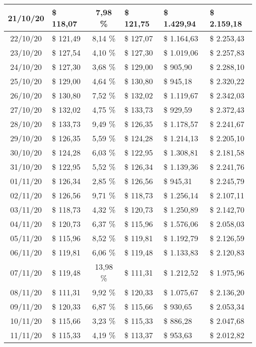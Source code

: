 \begin{center}
\begin{small}
\begin{longtable}{|c|l|c|l|l|l|}
21/10/20 & \$ 118,07 & 7,98 \% & \$ 121,75 & \$ 1.429,94 & \$ 2.159,18 \\ \hline
22/10/20 & \$ 121,49 & 8,14 \% & \$ 127,07 & \$ 1.164,63 & \$ 2.253,43 \\ \hline
23/10/20 & \$ 127,54 & 4,10 \% & \$ 127,30 & \$ 1.019,06 & \$ 2.257,83 \\ \hline
24/10/20 & \$ 127,30 & 3,68 \% & \$ 129,00 & \$ 905,90 & \$ 2.288,10 \\ \hline
25/10/20 & \$ 129,00 & 4,64 \% & \$ 130,80 & \$ 945,18 & \$ 2.320,22 \\ \hline
26/10/20 & \$ 130,80 & 7,52 \% & \$ 132,02 & \$ 1.119,67 & \$ 2.342,03 \\ \hline
27/10/20 & \$ 132,02 & 4,75 \% & \$ 133,73 & \$ 929,59 & \$ 2.372,43 \\ \hline
28/10/20 & \$ 133,73 & 9,49 \% & \$ 126,35 & \$ 1.178,57 & \$ 2.241,67 \\ \hline
29/10/20 & \$ 126,35 & 5,59 \% & \$ 124,28 & \$ 1.214,13 & \$ 2.205,10 \\ \hline
30/10/20 & \$ 124,28 & 6,03 \% & \$ 122,95 & \$ 1.308,81 & \$ 2.181,58 \\ \hline
31/10/20 & \$ 122,95 & 5,52 \% & \$ 126,34 & \$ 1.139,36 & \$ 2.241,76 \\ \hline
01/11/20 & \$ 126,34 & 2,85 \% & \$ 126,56 & \$ 945,31 & \$ 2.245,79 \\ \hline
02/11/20 & \$ 126,56 & 9,71 \% & \$ 118,73 & \$ 1.256,14 & \$ 2.107,11 \\ \hline
03/11/20 & \$ 118,73 & 4,32 \% & \$ 120,73 & \$ 1.250,89 & \$ 2.142,70 \\ \hline
04/11/20 & \$ 120,73 & 6,37 \% & \$ 115,96 & \$ 1.576,06 & \$ 2.058,03 \\ \hline
05/11/20 & \$ 115,96 & 8,52 \% & \$ 119,81 & \$ 1.192,79 & \$ 2.126,59 \\ \hline
06/11/20 & \$ 119,81 & 6,06 \% & \$ 119,48 & \$ 1.133,83 & \$ 2.120,83 \\ \hline
07/11/20 & \$ 119,48 & 13,98 \% & \$ 111,31 & \$ 1.212,52 & \$ 1.975,96 \\ \hline
08/11/20 & \$ 111,31 & 9,92 \% & \$ 120,33 & \$ 1.075,67 & \$ 2.136,20 \\ \hline
09/11/20 & \$ 120,33 & 6,87 \% & \$ 115,66 & \$ 930,65 & \$ 2.053,34 \\ \hline
10/11/20 & \$ 115,66 & 3,23 \% & \$ 115,33 & \$ 886,28 & \$ 2.047,68 \\ \hline
11/11/20 & \$ 115,33 & 4,19 \% & \$ 113,37 & \$ 953,63 & \$ 2.012,82 \\ \hline

\end{longtable}
\end{small}
\end{center}

